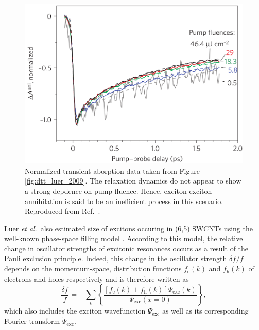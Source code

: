 \begin{figure}[ht]
	\centering
	\includegraphics[scale=1.2]{images/chapter_prior_works/dtt_3_luer_2009}
	\caption{Normalized transient aborption data taken from Figure \ref{fig:dtt_luer_2009}. The relaxation dynamics do not appear to show a strong depdence on pump fluence. Hence, exciton-exciton annihilation is said to be an inefficient process in this scenario. Reproduced from Ref.\ \cite{luer2009size}.}
	\label{fig:dtt_2_luer_2009}
\end{figure}

Luer \textit{et al}.\ also estimated size of excitons occuring in (6,5) SWCNTs using the well-known phase-space filling model \cite{schmitt1985theory, greene1990all}. According to this model, the relative change in oscillator strengths of excitonic resonances occurs as a result of the Pauli exclusion principle. Indeed, this change in the oscillator strength $\delta f_\text{}/ f_\text{}$ depends on the momentum-space, distribution functions $f_\text{e}(k)$ and $f_\text{h}(k)$ of electrons and holes respectively and is therefore written as
\begin{equation}
	\frac{\delta f_\text{}}{f_\text{}} = - \sum_{k} \left\{ \frac{ [ f_\text{e}(k) + f_\text{h}(k)] \tilde{\Psi}_\text{exc}(k)}{\Psi_\text{exc}(x=0)} \right\},
	\label{eq:osc_strength}
\end{equation}
which also includes the exciton wavefunction $\Psi_\text{exc}$ as well as its corresponding Fourier transform $\tilde{\Psi}_\text{exc}$.



